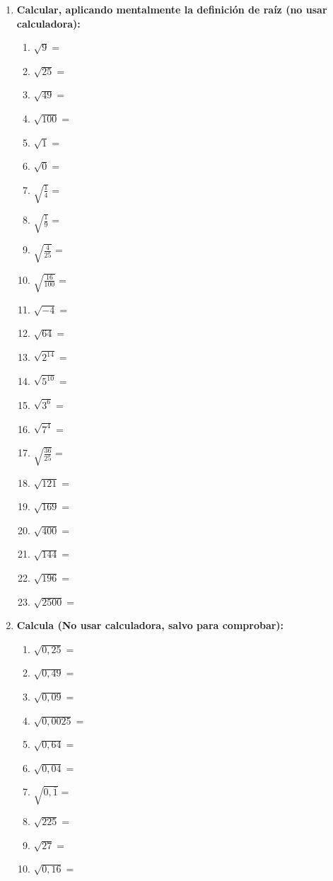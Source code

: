 \documentclass[a4paper,12pt]{article}
\begin{document}
\begin{enumerate}
    \item \textbf{Calcular, aplicando mentalmente la definición de raíz (no usar calculadora):}
    \begin{multicols}{4}
    \begin{enumerate}[label=\alph*)]
        \item $\sqrt{9} =$
        \item $\sqrt{25} =$
        \item $\sqrt{49} =$
        \item $\sqrt{100} =$
        \item $\sqrt{1} =$
        \item $\sqrt{0} =$
        \item $\sqrt{\frac{1}{4}} =$
        \item $\sqrt{\frac{1}{9}} =$
        \item $\sqrt{\frac{4}{25}} =$
        \item $\sqrt{\frac{16}{100}} =$
        \item $\sqrt{-4} =$
        \item $\sqrt{64} =$
        \item $\sqrt{2^{14}} =$
        \item $\sqrt{5^{10}} =$
        \item $\sqrt{3^6} =$
        \item $\sqrt{7^4} =$
        \item $\sqrt{\frac{36}{25}} =$
        \item $\sqrt{121} =$
        \item $\sqrt{169} =$
        \item $\sqrt{400} =$
        \item $\sqrt{144} =$
        \item $\sqrt{196} =$
        \item $\sqrt{2500} =$
    \end{enumerate}
    \end{multicols}

    \item \textbf{Calcula (No usar calculadora, salvo para comprobar):}
    \begin{multicols}{3}
    \begin{enumerate}[label=\alph*)]
        \item $\sqrt{0,25} =$
        \item $\sqrt{0,49} =$
        \item $\sqrt{0,09} =$
        \item $\sqrt{0,0025} =$
        \item $\sqrt{0,64} =$
        \item $\sqrt{0,04} =$
        \item $\sqrt{0,\bar{1}} =$
        \item $\sqrt{225} =$
        \item $\sqrt{27} =$
        \item $\sqrt{0,16} =$
    \end{enumerate}
    \end{multicols}


\end{enumerate}
\end{document}
